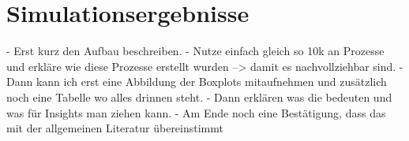 

\section{Simulationsergebnisse}
- Erst kurz den Aufbau beschreiben. 
- Nutze einfach gleich so 10k an Prozesse und erkläre wie diese Prozesse erstellt wurden --> damit es nachvollziehbar sind. 
- Dann kann ich erst eine Abbildung der Boxplots mitaufnehmen und zusätzlich noch eine Tabelle wo alles drinnen steht. 
- Dann erklären was die bedeuten und was für Insights man ziehen kann. 
- Am Ende noch eine Bestätigung, dass das mit der allgemeinen Literatur übereinstimmt